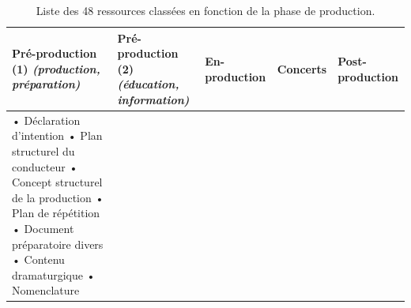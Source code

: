 \begin{landscape}
	\begin{table}[htbp]
		\centering
		\caption{Liste des 48 ressources classées en fonction de la phase de production.}
		\label{tab:ressources_production}
		
		\vspace{0.3cm}
		
		{\tiny
			\renewcommand{\arraystretch}{1.15}
			\setlength{\tabcolsep}{5pt}
			\setlength{\extrarowheight}{3pt}
			
			\begin{tabular}{|p{3.4cm}|p{6.8cm}|p{3.8cm}|p{3.2cm}|p{3.2cm}|}
				\hline
				\textbf{Pré-production (1)} \newline \textit{(production, préparation)} & 
				\textbf{Pré-production (2)} \newline \textit{(éducation, information)} & 
				\textbf{En-production} & 
				\textbf{Concerts} & 
				\textbf{Post-production} \\ 
				\hline
				
				• Déclaration d’intention \newline
				• Plan structurel du conducteur \newline
				• Concept structurel de la production \newline
				• Plan de répétition \newline
				• Document préparatoire divers \newline
				• Contenu dramaturgique \newline
				• Nomenclature & 
				

\end{tabular}}
\end{table}
\end{landscape}
